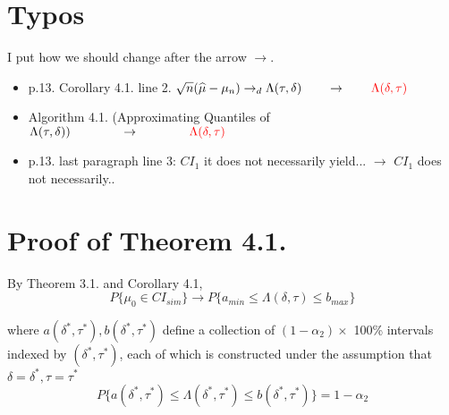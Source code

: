 \documentclass[11pt]{article}
\begin{document}



\doublespacing



\section*{Typos}

I put how we should change after the arrow $\rightarrow$. 

\begin{itemize}
\item p.13. Corollary 4.1. line 2. $\sqrt{n} (\widehat{\mu} - \mu_n) \rightarrow_d \Lambda(\tau, \delta) \quad \quad \rightarrow\quad \quad  \textcolor{red}{\Lambda(\delta, \tau)}$
\item Algorithm 4.1. (Approximating Quantiles of $\Lambda(\tau, \delta)) \qquad \qquad \rightarrow \qquad \qquad \textcolor{red}{\Lambda(\delta, \tau)}$
\item p.13. last paragraph line 3: $CI_1$ it does not necessarily yield... $\rightarrow$ $CI_1$ does not necessarily.. 
\end{itemize}

\section*{Proof of Theorem 4.1.}
By Theorem 3.1. and Corollary 4.1, 
\[
P\{ \mu_0 \in CI_{sim}\} \rightarrow P\{ a_{min} \leq \Lambda(\delta, \tau) \leq b_{max}\}
\]

where $a(\delta^{*}, \tau^{*}), b(\delta^{*}, \tau^{*})$ define a collection of $(1-\alpha_2) \times $ 100\% intervals indexed by $(\delta^{*}, \tau^{*})$, each of which is constructed under the assumption that $\delta=\delta^{*}, \tau=\tau^{*}$
\[
P\{a(\delta^{*},\tau^{*}) \leq \Lambda(\delta^{*}, \tau^{*})\leq b(\delta^{*}, \tau^{*})\} = 1-\alpha_2
\]
\end{document}
